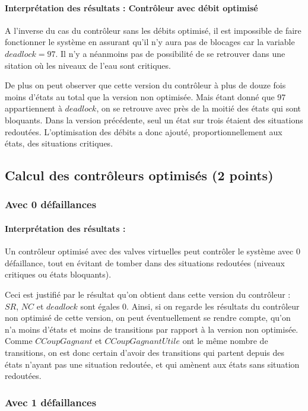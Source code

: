 \documentclass[a4paper]{book}
\begin{document}
\paragraph{Interprétation des résultats : Contrôleur avec débit optimisé}
A l'inverse du cas du contrôleur sans les débits optimisé, il est impossible de faire fonctionner le système en assurant qu'il n'y aura pas de blocages car la variable $deadlock = 97$.
Il n'y a néanmoins pas de possibilité de se retrouver dans une sitation où les niveaux de l'eau sont critiques.

De plus on peut observer que cette version du contrôleur à plus de douze fois moins d'états au total que la version non optimisée. Mais étant donné que 97 appartiennent à $deadlock$, on se retrouve avec près de la moitié des états qui sont bloquants.
Dans la version précédente, seul un état sur trois étaient des situations redoutées. L'optimisation des débits a donc ajouté, proportionnellement aux états, des situations critiques.

\subsection{Calcul des contrôleurs optimisés (2 points)}
\subsubsection{Avec 0 défaillances}

\paragraph{Interprétation des résultats : }
Un contrôleur optimisé avec des valves virtuelles peut contrôler le système avec 0 défaillance, tout en évitant de tomber dans des situations redoutées (niveaux critiques ou états bloquants).

Ceci est justifié par le résultat qu'on obtient dans cette version du contrôleur : $SR$, $NC$ et $deadlock$ sont égales $0$. Ainsi, si on regarde les résultats du contrôleur non optimisé de cette version,
on peut éventuellement se rendre compte, qu'on n'a moins d'états et moins de transitions par rapport à la version non optimisée. Comme $CCoupGagnant$ et $CCoupGagnantUtile$ ont le même nombre de transitions,
on est donc certain d'avoir des transitions qui partent depuis des états n'ayant pas une situation redoutée, et qui amènent aux états sans situation redoutées.

\subsubsection{Avec 1 défaillances}

\end{document}
